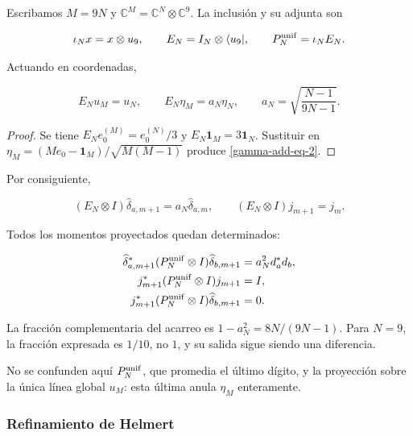 Escribamos \(M=9N\) y \(\mathbb C^M=\mathbb C^N\otimes\mathbb C^9\). La inclusión y su adjunta son

\begin{equation}
\iota_Nx=x\otimes u_9,\qquad
E_N=I_N\otimes\langle u_9|,\qquad P_N^{\rm unif}=\iota_NE_N.
\label{gamma-add-display-8}
\end{equation}

Actuando en coordenadas,

\begin{equation}
E_Nu_M=u_N,\qquad
E_N\eta_M=a_N\eta_N,\qquad
a_N=\sqrt{\frac{N-1}{9N-1}}.
\label{gamma-add-eq-2}
\end{equation}

\begin{proof}
Se tiene \(E_Ne_0^{(M)}=e_0^{(N)}/3\) y \(E_N\mathbf1_M=3\mathbf1_N\).
Sustituir en \(\eta_M=(Me_0-\mathbf1_M)/\sqrt{M(M-1)}\)
produce \eqref{gamma-add-eq-2}.
\end{proof}

Por consiguiente,

\begin{equation}
(E_N\otimes I)\widehat\delta_{a,m+1}=a_N\widehat\delta_{a,m},
\qquad
(E_N\otimes I)j_{m+1}=j_m.
\label{gamma-add-eq-3}
\end{equation}

Todos los momentos proyectados quedan determinados:

\begin{equation}
\begin{aligned}
\widehat\delta_{a,m+1}^*(P_N^{\rm unif}\otimes I)\widehat\delta_{b,m+1}
 &=a_N^2d_a^*d_b,\\
j_{m+1}^*(P_N^{\rm unif}\otimes I)j_{m+1}&=I,\\
j_{m+1}^*(P_N^{\rm unif}\otimes I)\widehat\delta_{b,m+1}&=0.
\end{aligned}
\label{gamma-add-eq-4}
\end{equation}

La fracción complementaria del acarreo es \(1-a_N^2=8N/(9N-1)\). Para \(N=9\), la fracción expresada es \(1/10\), no \(1\), y su salida sigue siendo una diferencia.

No se confunden aquí \(P_N^{\rm unif}\), que promedia el último dígito, y la proyección sobre la única línea global \(u_M\): esta última anula \(\eta_M\) enteramente.

\subsubsection{Refinamiento de Helmert}
\label{gamma-add-sub-156}

